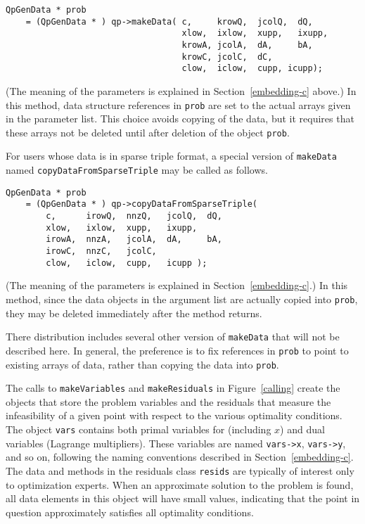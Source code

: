 \pagebreak
\begin{verbatim}
QpGenData * prob 
    = (QpGenData * ) qp->makeData( c,     krowQ,  jcolQ,  dQ,
                                   xlow,  ixlow,  xupp,   ixupp,
                                   krowA, jcolA,  dA,     bA,
                                   krowC, jcolC,  dC,
                                   clow,  iclow,  cupp, icupp);
\end{verbatim}
(The meaning of the parameters is explained in
Section~\ref{embedding-c} above.)  In this method, data structure
references in \texttt{prob} are set to the actual arrays given in the
parameter list.  This choice avoids copying of the data, but it
requires that these arrays not be deleted until after deletion of the
object \texttt{prob}.

For users whose data is in sparse triple format, a special version of
\texttt{makeData} named \texttt{copyDataFromSparseTriple} may be
called as follows.
\begin{verbatim}
QpGenData * prob 
    = (QpGenData * ) qp->copyDataFromSparseTriple(
        c,      irowQ,  nnzQ,   jcolQ,  dQ,
        xlow,   ixlow,  xupp,   ixupp,
        irowA,  nnzA,   jcolA,  dA,     bA,
        irowC,  nnzC,   jcolC, 
        clow,   iclow,  cupp,   icupp );
\end{verbatim}
(The meaning of the parameters is explained in
Section~\ref{embedding-c}.) In this method, since the data
objects in the argument list are actually copied into \texttt{prob},
they may be deleted immediately after the method returns.

There distribution includes several other version of \texttt{makeData}
that will not be described here. In general, the preference is to fix
references in \texttt{prob} to point to existing arrays of data,
rather than copying the data into \texttt{prob}.

The calls to \texttt{makeVariables} and \texttt{makeResiduals} in
Figure~\ref{calling} create the objects that store the problem
variables and the residuals that measure the infeasibility of a given
point with respect to the various optimality conditions.
The object \texttt{vars} contains both primal variables for
 (including $x$) and dual variables (Lagrange
multipliers). These variables are named \texttt{vars->x},
\texttt{vars->y}, and so on, following the naming conventions
described in Section~\ref{embedding-c}. The data and methods in
the residuals class \texttt{resids} are typically of interest only to
optimization experts. When an approximate solution to the problem
 is found, all data elements in this object will have
small values, indicating that the point in question approximately
satisfies all optimality conditions.

